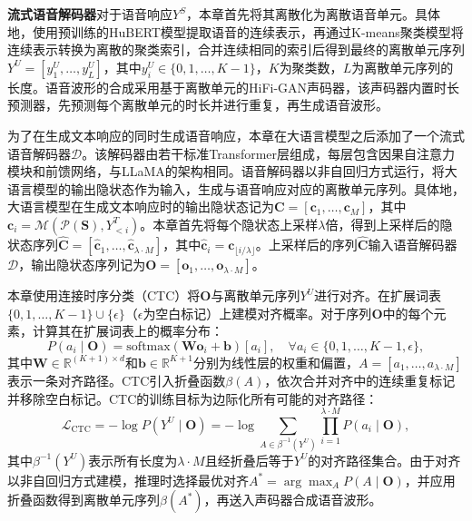 \textbf{流式语音解码器}\quad 对于语音响应$Y^S$，本章首先将其离散化为离散语音单元。具体地，使用预训练的HuBERT\citep{hubert}模型提取语音的连续表示，再通过K-means聚类模型将连续表示转换为离散的聚类索引，合并连续相同的索引后得到最终的离散单元序列$Y^U = [y^U_1, \ldots, y^U_L]$，其中$y^U_i \in \{0, 1, \ldots, K-1\}$，$K$为聚类数，$L$为离散单元序列的长度。语音波形的合成采用基于离散单元的HiFi-GAN\citep{hifigan}声码器，该声码器内置时长预测器\citep{polyak21_interspeech}，先预测每个离散单元的时长并进行重复，再生成语音波形。

为了在生成文本响应的同时生成语音响应，本章在大语言模型之后添加了一个流式语音解码器$\mathcal{D}$。该解码器由若干标准Transformer\citep{transformer}层组成，每层包含因果自注意力模块和前馈网络，与LLaMA的架构相同。语音解码器以非自回归方式运行，将大语言模型的输出隐状态作为输入，生成与语音响应对应的离散单元序列。具体地，大语言模型在生成文本响应时的输出隐状态记为$\mathbf{C} = [\mathbf{c}_1, \ldots, \mathbf{c}_M]$，其中$\mathbf{c}_i = \mathcal{M}(\mathcal{P}(\mathbf{S}), Y^T_{<i})$。本章首先将每个隐状态上采样$\lambda$倍，得到上采样后的隐状态序列$\widehat{\mathbf{C}} = [\widehat{\mathbf{c}}_1, \ldots, \widehat{\mathbf{c}}_{\lambda \cdot M}]$，其中$\widehat{\mathbf{c}}_i = \mathbf{c}_{\lfloor i/\lambda \rfloor}$。上采样后的序列$\widehat{\mathbf{C}}$输入语音解码器$\mathcal{D}$，输出隐状态序列记为$\mathbf{O} = [\mathbf{o}_1, \ldots, \mathbf{o}_{\lambda \cdot M}]$。

本章使用连接时序分类（CTC）\citep{ctc}将$\mathbf{O}$与离散单元序列$Y^U$进行对齐。在扩展词表$\{0, 1, \ldots, K-1\} \cup \{\epsilon\}$（$\epsilon$为空白标记）上建模对齐概率。对于序列$\mathbf{O}$中的每个元素，计算其在扩展词表上的概率分布：
\begin{equation}
    P(a_i \mid \mathbf{O}) = \text{softmax}(\mathbf{W}\mathbf{o}_i + \mathbf{b})[a_i], \quad \forall a_i \in \{0, 1, \ldots, K-1, \epsilon\},
\end{equation}
其中$\mathbf{W} \in \mathbb{R}^{(K+1) \times d}$和$\mathbf{b} \in \mathbb{R}^{K+1}$分别为线性层的权重和偏置，$A = [a_1, \ldots, a_{\lambda \cdot M}]$表示一条对齐路径。CTC引入折叠函数$\beta(A)$，依次合并对齐中的连续重复标记并移除空白标记。CTC的训练目标为边际化所有可能的对齐路径：
\begin{equation}
    \mathcal{L}_{\text{CTC}} = -\log P(Y^U \mid \mathbf{O}) = -\log \sum_{A \in \beta^{-1}(Y^U)} \prod_{i=1}^{\lambda \cdot M} P(a_i \mid \mathbf{O}),
    \label{eq:ctc_loss}
\end{equation}
其中$\beta^{-1}(Y^U)$表示所有长度为$\lambda \cdot M$且经折叠后等于$Y^U$的对齐路径集合。由于对齐以非自回归方式建模，推理时选择最优对齐$A^* = \arg\max_A P(A \mid \mathbf{O})$，并应用折叠函数得到离散单元序列$\beta(A^*)$，再送入声码器合成语音波形。

